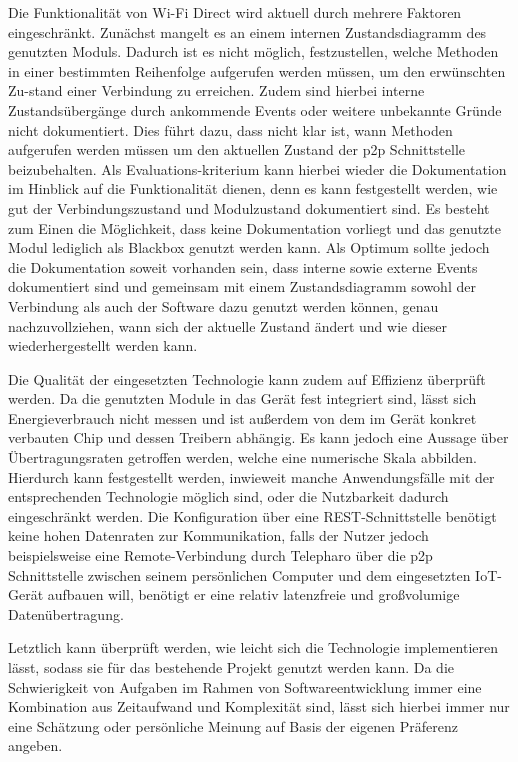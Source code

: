         Die Funktionalität von Wi-Fi Direct wird aktuell durch mehrere Faktoren \linebreak eingeschränkt. Zunächst mangelt es an einem internen Zustandsdiagramm des genutzten Moduls. Dadurch ist es nicht möglich, festzustellen, welche Methoden in einer bestimmten Reihenfolge aufgerufen werden müssen, um den erwünschten Zu-stand einer Verbindung zu erreichen. Zudem sind hierbei interne Zustandsübergänge durch ankommende Events oder weitere unbekannte Gründe nicht dokumentiert. Dies führt dazu, dass nicht klar ist, wann Methoden aufgerufen werden müssen um den aktuellen Zustand der p2p Schnittstelle beizubehalten.
        Als Evaluations-kriterium kann hierbei wieder die Dokumentation im Hinblick auf die \linebreak Funktionalität dienen, denn es kann festgestellt werden, wie gut der Verbindungszustand und Modulzustand dokumentiert sind. Es besteht zum Einen die Möglichkeit, dass keine Dokumentation vorliegt und das genutzte Modul lediglich als Blackbox genutzt werden kann. Als Optimum sollte jedoch die Dokumentation soweit vorhanden sein, dass interne sowie externe Events dokumentiert sind und gemeinsam mit einem Zustandsdiagramm sowohl der Verbindung als auch der Software dazu genutzt werden können, genau nachzuvollziehen, wann sich der aktuelle Zustand ändert und wie dieser wiederhergestellt werden kann.
        
        Die Qualität der eingesetzten Technologie kann zudem auf Effizienz überprüft werden. Da die genutzten Module in das Gerät fest integriert sind, lässt sich Energieverbrauch nicht messen und ist außerdem von dem im Gerät konkret verbauten Chip und dessen Treibern abhängig. Es kann jedoch eine Aussage über Übertragungsraten getroffen werden, welche eine numerische Skala abbilden. Hierdurch kann festgestellt werden, inwieweit manche Anwendungsfälle mit der entsprechenden Technologie möglich sind, oder die Nutzbarkeit dadurch eingeschränkt werden. Die Konfiguration über eine REST-Schnittstelle benötigt keine hohen Datenraten zur Kommunikation, falls der Nutzer jedoch beispielsweise eine Remote-Verbindung durch Telepharo über die p2p Schnittstelle zwischen seinem persönlichen Computer und dem eingesetzten IoT-Gerät aufbauen will, benötigt er eine relativ latenzfreie und großvolumige Datenübertragung.
        
        Letztlich kann überprüft werden, wie leicht sich die Technologie implementieren lässt, sodass sie für das bestehende Projekt genutzt werden kann. Da die Schwierigkeit von Aufgaben im Rahmen von Softwareentwicklung immer eine Kombination aus Zeitaufwand und Komplexität sind, lässt sich hierbei immer nur eine Schätzung oder persönliche Meinung auf Basis der eigenen Präferenz angeben.
